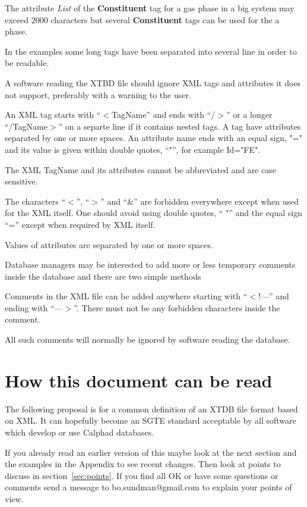 \documentclass{article}
\begin{document}
The attribute {\em List} of the {\bf Constituent} tag for a gas phase
in a big system may exceed 2000 characters but several {\bf
  Constituent} tags can be used for the a phase.

In the examples some long tags have been separated into several line
in order to be readable.

A software reading the XTBD file should ignore XML tags and attributes
it does not support, preferably with a warning to the user.

An XML tag starts with ``$<$TagName'' and ends with ``/$>$'' or a
longer ``/TagName$>$'' on a separte line if it contains nested tags.
A tag have attributes separated by one or more spaces.  An attribute
name ends with an equal sign, "=" and its value is given within double
quotes, ``"'', for example Id="FE".

The XML TagName and its attributes cannot be abbreviated and are case
sensitive.

The characters ``$<$'', ``$>$''  and ``\&'' are forbidden everywhere
except when used for the XML itself.  One should avoid using double
quotes, `` "'' and the equal sign ``='' except when required by XML
itself.

Values of attributes are separated by one or more spaces.

Database managers may be interested to add more or less temporary
comments inside the database and there are two simple methods

Comments in the XML file can be added anywhere starting with
``$<$!---'' and ending with ``---$>$''.  There must not be any
forbidden characters inside the comment.

All such comments will normally be ignored by software reading the
database.

\section{How this document can be read}

The following proposal is for a common definition of an XTDB file
format based on XML.  It can hopefully become an SGTE standard
acceptable by all software which develop or use Calphad databases.

If you already read an earlier version of this maybe look at the next
section and the examples in the Appendix to see recent changes.  Then
look at points to discuss in section~\ref{sec:points}.  If you find
all OK or have some questions or comments send a message to
bo.sundman@gmail.com to explain your points of view.
\end{document}
